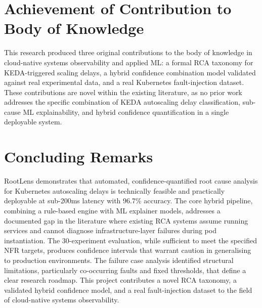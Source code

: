 \section{Achievement of Contribution to Body of Knowledge}
This research produced three original contributions to the body of knowledge in cloud-native systems observability and applied ML: a formal RCA taxonomy for KEDA-triggered scaling delays, a hybrid confidence combination model validated against real experimental data, and a real Kubernetes fault-injection dataset. These contributions are novel within the existing literature, as no prior work addresses the specific combination of KEDA autoscaling delay classification, sub-cause ML explainability, and hybrid confidence quantification in a single deployable system.

\section{Concluding Remarks}
RootLens demonstrates that automated, confidence-quantified root cause analysis for Kubernetes autoscaling delays is technically feasible and practically deployable at sub-200ms latency with 96.7\% accuracy. The core hybrid pipeline, combining a rule-based engine with ML explainer models, addresses a documented gap in the literature where existing RCA systems assume running services and cannot diagnose infrastructure-layer failures during pod instantiation. The 30-experiment evaluation, while sufficient to meet the specified NFR targets, produces confidence intervals that warrant caution in generalising to production environments. The failure case analysis identified structural limitations, particularly co-occurring faults and fixed thresholds, that define a clear research roadmap. This project contributes a novel RCA taxonomy, a validated hybrid confidence model, and a real fault-injection dataset to the field of cloud-native systems observability.

